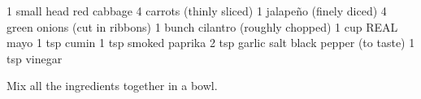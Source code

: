 \dishtype{\vegetarian}
\begin{ingreds}
    1 small head red cabbage
    4 carrots (thinly sliced)
    1 jalapeño (finely diced)
    4 green onions (cut in ribbons)
    1 bunch cilantro (roughly chopped)
    1 cup REAL mayo
    1 tsp cumin
    1 tsp smoked paprika
    2 tsp garlic salt
    black pepper (to taste)
    1 tsp vinegar       
\end{ingreds}
\begin{method}
    Mix all the ingredients together in a bowl.
\end{method}